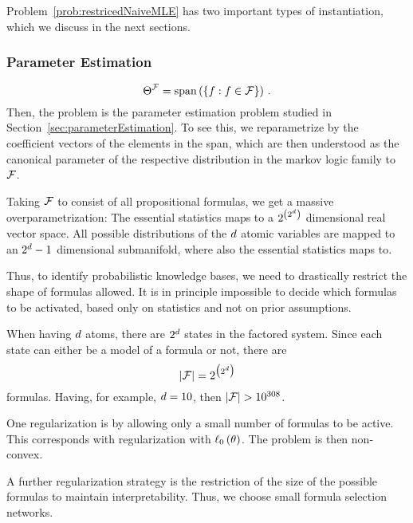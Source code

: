 Problem~\ref{prob:restricedNaiveMLE} has two important types of instantiation, which we discuss in the next sections.

\subsubsection{Parameter Estimation}

	\[ \Theta^{\mathcal{F}} = \mathrm{span}\left(\{f : f\in\mathcal{F} \}\right) \, . \]
Then, the problem is the parameter estimation problem studied in Section~\ref{sec:parameterEstimation}.
To see this, we reparametrize by the coefficient vectors of the elements in the span, which are then understood as the canonical parameter of the respective distribution in the markov logic family to $\mathcal{F}$.


\begin{remark}[Overparametrization]
	Taking $\mathcal{F}$ to consist of all propositional formulas, we get a massive overparametrization: 
	The essential statistics maps to a $2^{\left(2^d \right)}$ dimensional real vector space.
	All possible distributions of the $d$ atomic variables are mapped to an $2^d-1$ dimensional submanifold, where also the essential statistics maps to.

	Thus, to identify probabilistic knowledge bases, we need to drastically restrict the shape of formulas allowed.
	It is in principle impossible to decide which formulas to be activated, based only on statistics and not on prior assumptions.

	When having $d$ atoms, there are $2^{d}$ states in the factored system.
	Since each state can either be a model of a formula or not, there are
		\[ \left|\mathcal{F}\right| = 2^{\big(2^d \big)} \]
	formulas.
	Having, for example, $d=10$, then $\cardof{\formulaset}>10^{308}$.


	One regularization is by allowing only a small number of formulas to be active.
	This corresponds with regularization with $\ell_0\left(\theta\right)$.
	The problem is then non-convex.


	A further regularization strategy is the restriction of the size of the possible formulas to maintain interpretability. 
	Thus, we choose small formula selection networks.
\end{remark}




